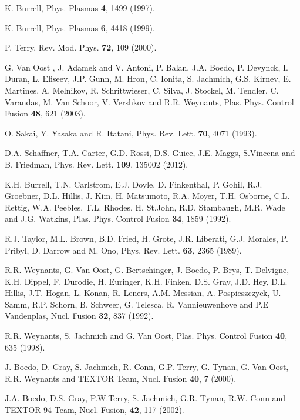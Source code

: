 \documentclass[aip,pop,amsmath,amssymb,preprint,superscriptaddress]{revtex4-1} %
\begin{document}
\providecommand{\noopsort}[1]{}\providecommand{\singleletter}[1]{#1}%
\begin{thebibliography}{10}

K. Burrell, Phys. Plasmas {\bf 4},  1499  (1997).

K. Burrell, Phys. Plasmas {\bf 6},  4418  (1999).

P. Terry, Rev. Mod. Phys. {\bf 72},  109  (2000).

G. Van Oost , J. Adamek and V. Antoni, P. Balan, J.A. Boedo, P. Devynck, I. Duran, L. Eliseev, J.P. Gunn, M. Hron, C. Ionita, S. Jachmich, G.S. Kirnev, E. Martines, A. Melnikov, R. Schrittwieser, C. Silva, J. Stockel, M. Tendler, C. Varandas, M. Van Schoor, V. Vershkov and R.R. Weynants, Plas. Phys. Control Fusion {\bf 48}, 621 (2003).

O. Sakai, Y. Yasaka and R. Itatani, Phys. Rev. Lett. {\bf 70},  4071 (1993).

D.A. Schaffner, T.A. Carter, G.D. Rossi, D.S. Guice, J.E. Maggs, S.Vincena and B. Friedman, Phys. Rev. Lett. {\bf 109}, 135002 (2012).

K.H. Burrell, T.N. Carlstrom, E.J. Doyle, D. Finkenthal, P. Gohil, R.J. Groebner, D.L. Hillis, J. Kim, H. Matsumoto, R.A. Moyer, T.H. Osborne, C.L. Rettig, W.A. Peebles, T.L. Rhodes, H. St.John, R.D. Stambaugh, M.R. Wade and J.G. Watkins, Plas. Phys. Control Fusion {\bf 34}, 1859 (1992). 

R.J. Taylor, M.L. Brown, B.D. Fried, H. Grote, J.R. Liberati, G.J. Morales, P. Pribyl, D. Darrow and M. Ono, Phys. Rev. Lett. {\bf 63},  2365  (1989).

R.R. Weynants, G. Van Oost, G. Bertschinger, J. Boedo, P. Brys, T. Delvigne, K.H. Dippel, F. Durodie, H. Euringer, K.H. Finken, D.S. Gray, J.D. Hey, D.L. Hillis, J.T. Hogan, L. Konan, R. Leners, A.M. Messian, A. Pospieszczyck, U. Samm, R.P. Schorn, B. Schweer, G. Telesca, R. Vannieuwenhove and P.E Vandenplas, Nucl. Fusion {\bf 32},  837  (1992).

R.R. Weynants, S. Jachmich and G. Van Oost, Plas. Phys. Control Fusion {\bf 40}, 635 (1998).

J. Boedo, D. Gray, S. Jachmich, R. Conn, G.P. Terry, G. Tynan, G. Van Oost, R.R. Weynants and TEXTOR Team, Nucl. Fusion {\bf 40},  7  (2000).

J.A. Boedo, D.S. Gray, P.W.Terry, S. Jachmich, G.R. Tynan, R.W. Conn and TEXTOR-94 Team, Nucl. Fusion, {\bf 42}, 117 (2002).



\end{thebibliography}
\end{document}
